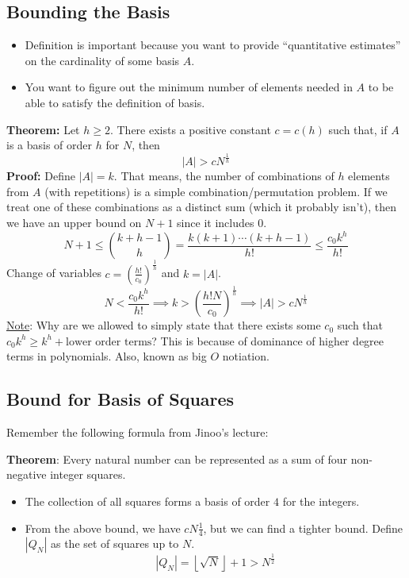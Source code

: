 \documentclass[8pt]{extarticle}
\begin{document}
\subsection{Bounding the Basis}
\begin{itemize}
    \item Definition is important because you want to provide ``quantitative estimates'' on the cardinality of some basis $A$. 
    \item You want to figure out the minimum number of elements needed in $A$ to be able to satisfy the definition of basis. 
\end{itemize}
\begin{boxedsection}
    \textbf{Theorem:} Let $h \geq 2$. There exists a positive constant $c = c(h)$ such that, if $A$ is a basis of order $h$ for $N$, then
    $$
    |A| > cN^{\frac{1}{h}}
    $$
    \textbf{Proof:} Define $|A| = k$. That means, the number of combinations of $h$ elements from $A$ (with repetitions) is a simple combination/permutation problem. If we treat one of these combinations as a distinct sum (which it probably isn't), then we have an upper bound on $N+1$ since it includes $0$.
    $$
    N+1 \leq {k+h-1 \choose h} = \frac{k(k+1)\cdots(k+h-1)}{h!} \leq \frac{c_0k^h}{h!}
    $$
Change of variables $c = \left(\frac{h!}{c_0}\right)^{\frac{1}{h}}$ and $k = |A|$. 
    $$
    N < \frac{c_0k^h}{h!} \implies k > \left(\frac{h! N}{c_0}\right)^{\frac{1}{h}} \implies |A| > cN^{\frac{1}{h}}
    $$
    \underline{Note}: Why are we allowed to simply state that there exists some $c_0$ such that $c_0k^h \geq k^h + \text{lower order terms}$? This is because of dominance of higher degree terms in polynomials. Also, known as big $O$ notiation.
\end{boxedsection}
\subsection{Bound for Basis of Squares}
Remember the following formula from Jinoo's lecture:
\begin{boxedsection}
    \textbf{Theorem}: Every natural number can be represented as a sum of four non-negative integer squares.
\end{boxedsection}
\begin{itemize}
    \item The collection of all squares forms a basis of order $4$ for the integers. 
    \item From the above bound, we have $c N \frac{1}{4}$, but we can find a tighter bound. Define $|Q_N|$ as the set of squares up to $N$.
    $$
    |Q_N| = \left\lfloor \sqrt{N} \right\rfloor + 1 > N^{\frac{1}{2}}
    $$
    
\end{itemize}
\end{document}
